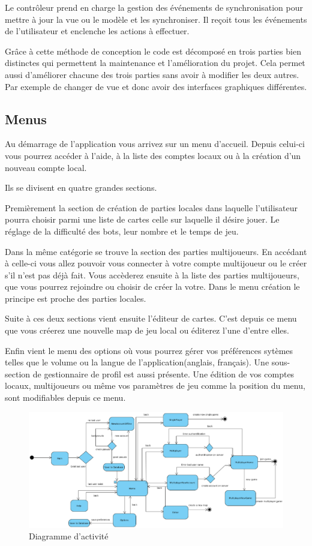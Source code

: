 	Le contrôleur prend en charge la gestion des événements de synchronisation 
	pour mettre à jour la vue ou le modèle et les synchroniser.
	Il reçoit tous les événements de l'utilisateur et enclenche les actions 
	à effectuer.
			
	Grâce à cette méthode de conception le code est décomposé en trois parties 
	bien distinctes qui permettent la maintenance et l'amélioration du projet.
	Cela permet aussi d'améliorer chacune des trois parties sans avoir à 
	modifier les deux autres.
	Par exemple de changer de vue et donc avoir des interfaces graphiques différentes.
			
\subsection{Menus}

	Au démarrage de l'application vous arrivez sur un menu d'accueil. Depuis
	celui-ci vous pourrez accéder à l'aide, à la liste des comptes locaux ou à la
	création d'un nouveau compte local.
	
	Ils se divisent en quatre grandes sections.
		
	Premièrement la section de création de parties locales dans laquelle l'utilisateur
	pourra choisir parmi une liste de cartes celle sur laquelle il désire jouer.
	Le réglage de la difficulté des \glspl{bot}, leur nombre et le temps de jeu.
		
	Dans la même catégorie se trouve la section des parties multijoueurs. En
	accédant à celle-ci vous allez pouvoir vous connecter à votre compte
	multijoueur ou le créer s'il n'est pas déjà fait. Vous accèderez ensuite à la liste
	des parties multijoueurs, que vous pourrez rejoindre ou choisir de créer la
	votre. Dans le menu création le principe est proche des parties locales.
		
	Suite à ces deux sections vient ensuite l'éditeur de cartes.
	C'est depuis ce menu que vous créerez une nouvelle map de jeu local ou 
	éditerez l'une d'entre elles.
		
	Enfin vient le menu des options où vous pourrez gérer vos
	préférences sytèmes telles que le volume ou la langue de
	l'application(anglais, français).
	Une sous-section de gestionnaire de profil est aussi présente.
	Une édition de vos comptes locaux, multijoueurs ou même
	vos paramètres de jeu comme la position du menu, sont modifiables depuis ce 
	menu.
	
	\begin{figure}
		\label{activité}
		\includegraphics[width=23cm, angle=90]{Analyse/Img/diag_activity.eps}
		\caption{Diagramme d'activité}
	\end{figure}

